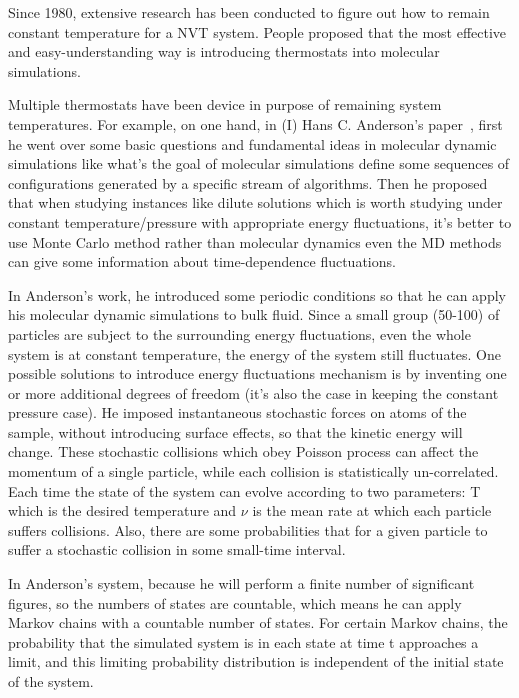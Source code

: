 \documentclass{article}
\begin{document}
\begin{spacing}{1}
Since 1980, extensive research has been conducted to figure out how to remain constant temperature for a NVT system. People proposed that the most effective and easy-understanding way is introducing thermostats into molecular simulations. 

Multiple thermostats have been device in purpose of remaining system temperatures. For example, on one hand, in (I) Hans C. Anderson’s paper~\cite{1}, first he went over some basic questions and fundamental ideas in molecular dynamic simulations like what’s the goal of molecular simulations define some sequences of configurations generated by a specific stream of algorithms. Then he proposed that when studying instances like dilute solutions which is worth studying under constant temperature/pressure with appropriate energy fluctuations, it’s better to use Monte Carlo method rather than molecular dynamics even the MD methods can give some information about time-dependence fluctuations. 

In Anderson’s work, he introduced some periodic conditions so that he can apply his molecular dynamic simulations to bulk fluid. Since a small group (50-100) of particles are subject to the surrounding energy fluctuations, even the whole system is at constant temperature, the energy of the system still fluctuates. One possible solutions to introduce energy fluctuations mechanism is by inventing one or more additional degrees of freedom (it’s also the case in keeping the constant pressure case). He imposed instantaneous stochastic forces on atoms of the sample, without introducing surface effects, so that the kinetic energy will change. These stochastic collisions which obey Poisson process can affect the momentum of a single particle, while each collision is statistically un-correlated. Each time the state of the system can evolve according to two parameters: T which is the desired temperature and $\nu$ is the mean rate at which each particle suffers collisions. Also, there are some probabilities that for a given particle to suffer a stochastic collision in some small-time interval.

In Anderson’s system, because he will perform a finite number of significant figures, so the numbers of states are countable, which means he can apply Markov chains with a countable number of states. For certain Markov chains, the probability that the simulated system is in each state at time t approaches a limit, and this limiting probability distribution is independent of the initial state of the system. 


\end{spacing}
\end{document}
